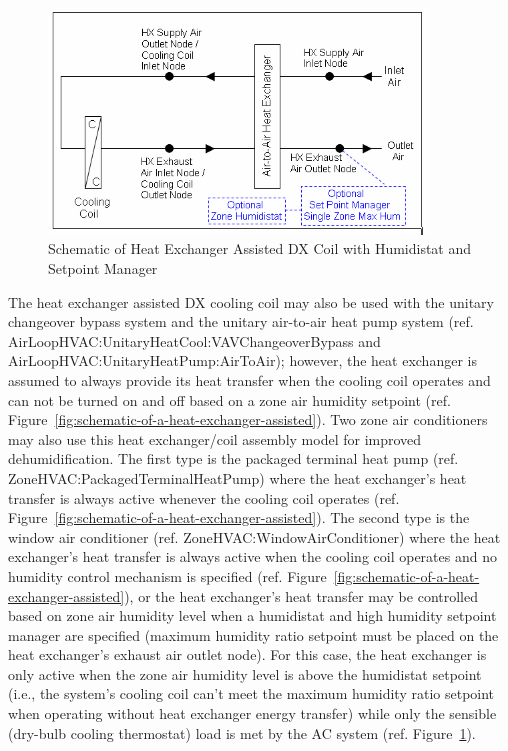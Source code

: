 \begin{figure}[hbtp] %
\centering
\includegraphics[width=0.9\textwidth, height=0.9\textheight, keepaspectratio=true]{media/image4095.png}
\caption{Schematic of Heat Exchanger Assisted DX Coil with Humidistat and Setpoint Manager \protect \label{fig:schematic-of-heat-exchanger-assisted-dx-coil}}
\end{figure}

The heat exchanger assisted DX cooling coil may also be used with the unitary changeover bypass system and the unitary air-to-air heat pump system (ref. AirLoopHVAC:UnitaryHeatCool:VAVChangeoverBypass and AirLoopHVAC:UnitaryHeatPump:AirToAir); however, the heat exchanger is assumed to always provide its heat transfer when the cooling coil operates and can not be turned on and off based on a zone air humidity setpoint (ref. Figure~\ref{fig:schematic-of-a-heat-exchanger-assisted}). Two zone air conditioners may also use this heat exchanger/coil assembly model for improved dehumidification. The first type is the packaged terminal heat pump (ref. ZoneHVAC:PackagedTerminalHeatPump) where the heat exchanger's heat transfer is always active whenever the cooling coil operates (ref. Figure~\ref{fig:schematic-of-a-heat-exchanger-assisted}). The second type is the window air conditioner (ref. ZoneHVAC:WindowAirConditioner) where the heat exchanger's heat transfer is always active when the cooling coil operates and no humidity control mechanism is specified (ref. Figure~\ref{fig:schematic-of-a-heat-exchanger-assisted}), or the heat exchanger's heat transfer may be controlled based on zone air humidity level when a humidistat and high humidity setpoint manager are specified (maximum humidity ratio setpoint must be placed on the heat exchanger's exhaust air outlet node). For this case, the heat exchanger is only active when the zone air humidity level is above the humidistat setpoint (i.e., the system's cooling coil can't meet the maximum humidity ratio setpoint when operating without heat exchanger energy transfer) while only the sensible (dry-bulb cooling thermostat) load is met by the AC system (ref. Figure~\ref{fig:schematic-of-heat-exchanger-assisted-dx-coil}).

